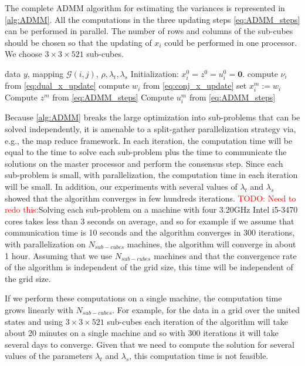 \documentclass{article}
\newcommand{\attn}[1]{\textcolor{red}{TODO: #1}}
\begin{document}
The complete ADMM algorithm for estimating the variances is
represented in \autoref{alg:ADMM}. All the computations in the three
updating steps \eqref{eq:ADMM_steps} can be performed in parallel. The
number of rows and columns of the sub-cubes should be chosen so that
the updating of $x_i$ could be performed in one processor. We choose
$3\times3\times521$ sub-cubes. 

\begin{algorithm}[tb]
  \caption{ADMM for sparse estimation of variance of spatio-temporal
    data \attn{Fix this}}
  \label{alg:ADMM}
  \begin{algorithmic}
     data $y$, mapping $\mathscr{G}(i,j)$,
    $\rho,\lambda_t,\lambda_s$ 
    \STATE Initialization: $x_i^0=z^0=u_i^0=\textbf{0}$.
    \STATE compute $\nu_i$ from \eqref{eq:dual_x_update}
    \STATE compute $w_i$ from \eqref{eq:conj_x_update}
    \STATE set $x_i^m:=w_i$
    \ENDFOR
    \STATE Compute $z^m$ from  \eqref{eq:ADMM_steps}
    \STATE Compute $u_i^m$ from  \eqref{eq:ADMM_steps}
    \ENDFOR
  \end{algorithmic}
\end{algorithm}

Because \autoref{alg:ADMM} breaks the large optimization into
sub-problems that can be solved independently, it is amenable to a
split-gather parallelization strategy via, e.g., the map reduce framework.
In each iteration, the
computation time will be equal to the time to solve each sub-problem
plus the time to communicate the solutions on the master processor
and perform the consensus step. Since each sub-problem is
small, with parallelization, the computation time in each iteration
will be small. In addition, our experiments with several values of
$\lambda_t$ and $\lambda_s$ showed that the algorithm converges in few
hundreds iterations. 
\attn{Need to redo this:}Solving each sub-problem on a machine with four
3.20GHz Intel i5-3470 cores takes less than 3 seconds on average, and
so for example if we assume that communication time is 10 seconds and
the algorithm converges in 300 iterations, with parallelization on
$N_{sub-cubes}$ machines, the algorithm will converge in about 1
hour. Assuming that we use $N_{sub-cubes}$ machines and that the
convergence rate of the algorithm is independent of the grid size,
this time will be independent of the grid size. 

If we perform these computations on a single machine, the computation
time grows linearly with $N_{sub-cubes}$. For example, for the data in
a grid over the united states and using $3\times3\times521$ sub-cubes
each iteration of the algorithm will take about 20 minutes on a single
machine and so with 300 iterations it will take several days to
converge. Given that we need to compute the solution for several
values of the parameters $\lambda_t$ and $\lambda_s$, this computation
time is not feasible. 
\end{document}
